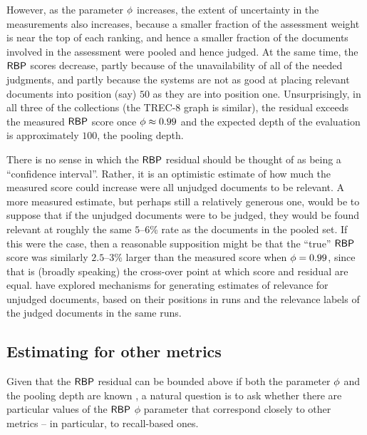 However, as the parameter $\mbox{$\phi$}$ increases, the extent of
uncertainty in the measurements also increases, because a smaller
fraction of the assessment weight is near the top of each ranking,
and hence a smaller fraction of the documents involved in the
assessment were pooled and hence judged.
At the same time, the ${\mbox{\sf{RBP}}}$ scores decrease, partly because of the
unavailability of all of the needed judgments, and partly because the
systems are not as good at placing relevant documents into position
(say) $50$ as they are into position one.
Unsurprisingly, in all three of the collections (the TREC-8 graph is
similar), the residual exceeds the measured ${\mbox{\sf{RBP}}}$ score once
$\mbox{$\phi$}\approx 0.99$ and the expected depth of the evaluation is
approximately $100$, the pooling depth.

There is no sense in which the ${\mbox{\sf{RBP}}}$ residual should be thought of
as being a ``confidence interval''.
Rather, it is an optimistic estimate of how much the measured
score could increase were all unjudged documents to be relevant.
A more measured estimate, but perhaps still a relatively generous
one, would be to suppose that if the unjudged documents were to be
judged, they would be found relevant at roughly the same $5$--$6$\%
rate as the documents in the pooled set.
If this were the case, then a reasonable supposition might be that
the ``true'' ${\mbox{\sf{RBP}}}$ score was similarly $2.5$--$3$\% larger than the
measured score when $\mbox{$\phi$}=0.99$, since that is (broadly speaking)
the cross-over point at which score and residual are equal.
{\citet{lmc17sigir}} have explored mechanisms for generating
estimates of relevance for unjudged documents, based on their
positions in runs and the relevance labels of the judged documents in
the same runs.

\subsection{Estimating {\rbpp} for other metrics}

Given that the ${\mbox{\sf{RBP}}}$ residual can be bounded above if both the
parameter $\mbox{$\phi$}$ and the pooling depth are known
{\citep{mz08acmtois}}, a natural question is to ask whether there are
particular values of the ${\mbox{\sf{RBP}}}$ $\phi$ parameter that correspond
closely to other metrics -- in particular, to recall-based ones.

